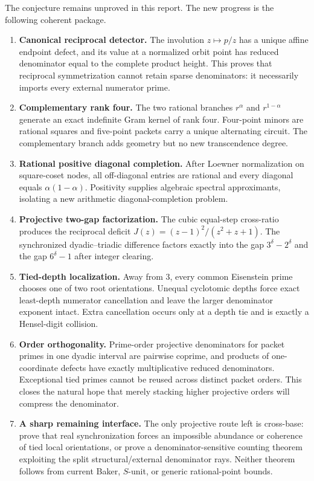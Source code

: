 \documentclass[11pt]{article}
\theoremstyle{definition}
\theoremstyle{remark}
\begin{document}
The conjecture remains unproved in this report.  The new progress is the following coherent package.

\begin{enumerate}
\item \textbf{Canonical reciprocal detector.}  The involution $z\mapsto p/z$ has a unique affine endpoint defect, and its value at a normalized orbit point has reduced denominator equal to the complete product height.  This proves that reciprocal symmetrization cannot retain sparse denominators: it necessarily imports every external numerator prime.

\item \textbf{Complementary rank four.}  The two rational branches $r^\alpha$ and $r^{1-\alpha}$ generate an exact indefinite Gram kernel of rank four.  Four-point minors are rational squares and five-point packets carry a unique alternating circuit.  The complementary branch adds geometry but no new transcendence degree.

\item \textbf{Rational positive diagonal completion.}  After Loewner normalization on square-coset nodes, all off-diagonal entries are rational and every diagonal equals $\alpha(1-\alpha)$.  Positivity supplies algebraic spectral approximants, isolating a new arithmetic diagonal-completion problem.

\item \textbf{Projective two-gap factorization.}  The cubic equal-step cross-ratio produces the reciprocal deficit $J(z)=(z-1)^2/(z^2+z+1)$.  The synchronized dyadic--triadic difference factors exactly into the gap $3^\delta-2^\delta$ and the gap $6^\delta-1$ after integer clearing.

\item \textbf{Tied-depth localization.}  Away from $3$, every common Eisenstein prime chooses one of two root orientations.  Unequal cyclotomic depths force exact least-depth numerator cancellation and leave the larger denominator exponent intact.  Extra cancellation occurs only at a depth tie and is exactly a Hensel-digit collision.

\item \textbf{Order orthogonality.}  Prime-order projective denominators for packet primes in one dyadic interval are pairwise coprime, and products of one-coordinate defects have exactly multiplicative reduced denominators.  Exceptional tied primes cannot be reused across distinct packet orders.  This closes the natural hope that merely stacking higher projective orders will compress the denominator.

\item \textbf{A sharp remaining interface.}  The only projective route left is cross-base: prove that real synchronization forces an impossible abundance or coherence of tied local orientations, or prove a denominator-sensitive counting theorem exploiting the split structural/external denominator rays.  Neither theorem follows from current Baker, $S$-unit, or generic rational-point bounds.
\end{enumerate}
\end{document}
